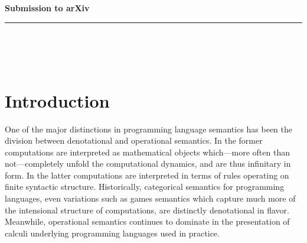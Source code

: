 \documentclass[]{acm_proc_article-sp}
\numberwithin{equation}{subsection}
\newcommand{\paperversion}{Draft Version 0.1 - Jan 7, 2015}
\newenvironment{toc}
{
\begin{list}{}{
   \setlength{\leftmargin}{0.4in}
   \setlength{\rightmargin}{0.6in}
   \setlength{\parskip}{0pt}
 } \item }
{\end{list}}
\begin{document}
\noindent
{\large \textbf{Submission to arXiv}}\\
\rule{6.25in}{0.75pt}\\\\\\

\maketitle




\section{Introduction}

One of the major distinctions in programming language semantics has
been the division between denotational and operational semantics. In
the former computations are interpreted as mathematical objects 
which---more often than not---completely unfold the computational
dynamics, and are thus infinitary in form. In the latter computations
are interpreted in terms of rules operating on finite syntactic
structure. Historically, categorical semantics for programming
languages, even variations such as games semantics which capture much
more of the intensional structure of computations, are distinctly
denotational in flavor. Meanwhile, operational semantics continues to
dominate in the presentation of calculi underlying programming
languages used in practice.
\end{document}
